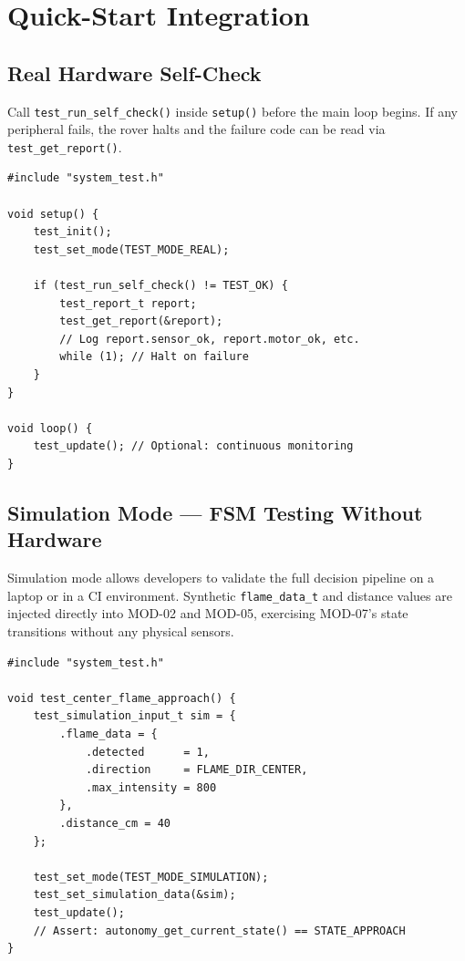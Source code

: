 \documentclass[a4paper,11pt]{article}
\begin{document}
\section{Quick-Start Integration}

\subsection{Real Hardware Self-Check}

Call \texttt{test\_run\_self\_check()} inside \texttt{setup()} before the main loop begins.
If any peripheral fails, the rover halts and the failure code can be read via
\texttt{test\_get\_report()}.

\begin{lstlisting}
#include "system_test.h"

void setup() {
    test_init();
    test_set_mode(TEST_MODE_REAL);

    if (test_run_self_check() != TEST_OK) {
        test_report_t report;
        test_get_report(&report);
        // Log report.sensor_ok, report.motor_ok, etc.
        while (1); // Halt on failure
    }
}

void loop() {
    test_update(); // Optional: continuous monitoring
}
\end{lstlisting}

\subsection{Simulation Mode --- FSM Testing Without Hardware}

Simulation mode allows developers to validate the full decision pipeline on a laptop or
in a CI environment. Synthetic \texttt{flame\_data\_t} and distance values are injected
directly into MOD-02 and MOD-05, exercising MOD-07's state transitions without any
physical sensors.

\begin{lstlisting}
#include "system_test.h"

void test_center_flame_approach() {
    test_simulation_input_t sim = {
        .flame_data = {
            .detected      = 1,
            .direction     = FLAME_DIR_CENTER,
            .max_intensity = 800
        },
        .distance_cm = 40
    };

    test_set_mode(TEST_MODE_SIMULATION);
    test_set_simulation_data(&sim);
    test_update();
    // Assert: autonomy_get_current_state() == STATE_APPROACH
}
\end{lstlisting}
\end{document}
